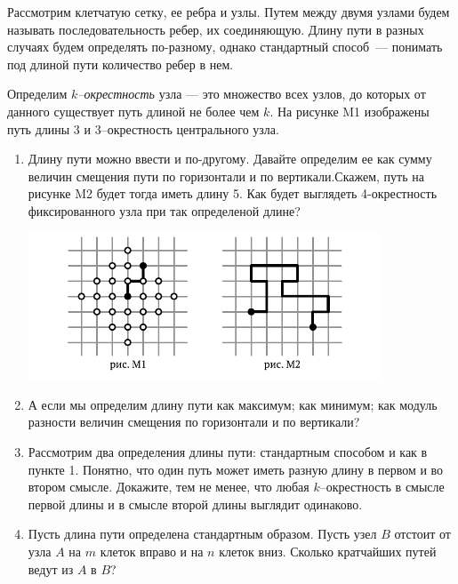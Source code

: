 ﻿

\noindent Рассмотрим клетчатую сетку, ее ребра и узлы. Путем между двумя узлами будем называть последовательность ребер, их соединяющую. Длину пути в разных случаях будем определять по-разному, однако стандартный способ~— понимать под длиной пути количество ребер в нем.

\ms Определим {\itshape $k$--окрестность} узла — это множество всех узлов, до которых от данного существует путь длиной не более чем $k$. На рисунке M1 изображены путь длины 3 и 3--окрестность центрального узла.

\begin{enumerate}

\item Длину пути можно ввести и по-другому. Давайте определим ее как сумму величин смещения пути по горизонтали и по вертикали.\linebreak Скажем, путь на рисунке M2 будет тогда иметь длину 5. Как будет выглядеть 4-окрестность фиксированного узла при так определеной длине?

\vspace{-0.3cm}
\begin{center}
\includegraphics[width=10.5cm]{stats/2017/images/metro1.pdf}
\end{center} \vspace{-0.7cm}

\item А если мы определим длину пути как максимум; как минимум; как модуль разности величин смещения по горизонтали и по вертикали?

\item Рассмотрим два определения длины пути: стандартным способом и как в пункте 1. Понятно, что один путь может иметь разную длину в первом и во втором смысле. Докажите, тем не менее, что любая $k$--окрестность в смысле первой длины и в смысле второй длины выглядит одинаково.

\item Пусть длина пути определена стандартным образом. Пусть узел $B$ отстоит от узла $A$ на $m$ клеток вправо и на $n$ клеток вниз. Сколько кратчайших путей ведут из $A$ в $B$?

\end{enumerate}

